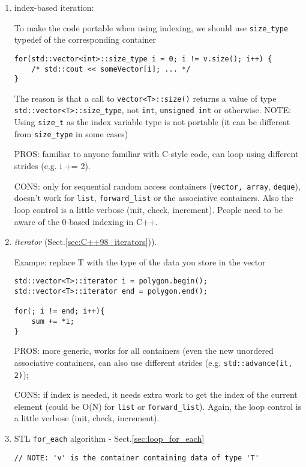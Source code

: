 \begin{enumerate}
  \item index-based iteration:

To make the code portable when using indexing, we should use \verb!size_type!
typedef of the corresponding container 
\begin{verbatim}
for(std::vector<int>::size_type i = 0; i != v.size(); i++) {
    /* std::cout << someVector[i]; ... */
}
\end{verbatim}
The reason is that a call to \verb!vector<T>::size()! returns a value of type
\verb!std::vector<T>::size_type!, not \verb!int!, \verb!unsigned int! or
otherwise. 
NOTE: Using \verb!size_t! as the index variable type is not portable (it can be
different from \verb!size_type! in some cases)


PROS: familiar to anyone familiar with C-style code, can loop using
  different strides (e.g. i += 2).
  
CONS: only for sequential random access containers (\verb!vector, array!,
\verb!deque!), doesn't work for \verb!list!, \verb!forward_list! or the
associative containers. Also the loop control is a little verbose (init, check,
increment). People need to be aware of the 0-based indexing in C++.

  
  \item {\it iterator} (Sect.\ref{sec:C++98_iterators})).

Exampe: replace T with the type of the data you store in the vector
\begin{verbatim}
std::vector<T>::iterator i = polygon.begin();
std::vector<T>::iterator end = polygon.end();

for(; i != end; i++){
    sum += *i;
}
\end{verbatim}

PROS: more generic, works for all containers (even the new unordered associative
containers, can also use different strides (e.g. \verb!std::advance(it, 2)!);
  
CONS: if index is needed, it needs extra work to get the index of the current
element (could be O(N) for \verb!list! or \verb!forward_list!). Again, the loop
control is a little verbose (init, check, increment).
  
  \item STL \verb!for_each! algorithm - Sect.\ref{sec:loop_for_each}
  
\begin{verbatim}
// NOTE: 'v' is the container containing data of type 'T'


\end{verbatim}
\end{enumerate}
